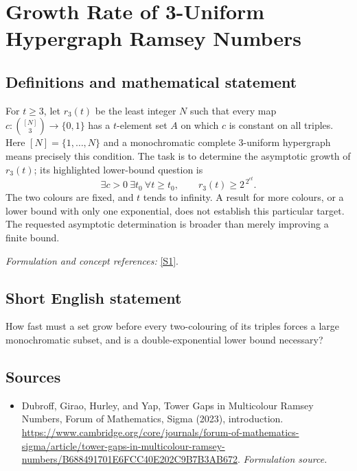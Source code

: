 \documentclass[11pt]{article}
\begin{document}
\section*{\texorpdfstring{Growth Rate of 3-Uniform Hypergraph Ramsey Numbers}{Growth Rate of 3-Uniform Hypergraph Ramsey Numbers}}\label{statement}
\subsection{Definitions and mathematical statement}
For $t\ge3$, let $r_3(t)$ be the least integer $N$ such that every map $c:\binom{[N]}3\to\{0,1\}$ has a $t$-element set $A$ on which $c$ is constant on all triples. Here $[N]=\{1,\ldots,N\}$ and a monochromatic complete $3$-uniform hypergraph means precisely this condition. The task is to determine the asymptotic growth of $r_3(t)$; its highlighted lower-bound question is
\[
 \exists c>0\ \exists t_0\ \forall t\ge t_0,
 \qquad r_3(t)\ge 2^{\,2^{ct}}.
\]
The two colours are fixed, and $t$ tends to infinity. A result for more colours, or a lower bound with only one exponential, does not establish this particular target. The requested asymptotic determination is broader than merely improving a finite bound.
\par\smallskip\textit{Formulation and concept references:} \href{https://www.cambridge.org/core/journals/forum-of-mathematics-sigma/article/tower-gaps-in-multicolour-ramsey-numbers/B688491701E6FCC40E202C9B7B3AB672}{[S1]}.

\subsection{Short English statement}
How fast must a set grow before every two-colouring of its triples forces a large monochromatic subset, and is a double-exponential lower bound necessary?
\subsection{Sources}
\begin{itemize}
\item[S1]Dubroff, Girao, Hurley, and Yap, Tower Gaps in Multicolour Ramsey Numbers, Forum of Mathematics, Sigma (2023), introduction.
\url{https://www.cambridge.org/core/journals/forum-of-mathematics-sigma/article/tower-gaps-in-multicolour-ramsey-numbers/B688491701E6FCC40E202C9B7B3AB672}.
\textit{Formulation source.}
\end{itemize}
\end{document}
